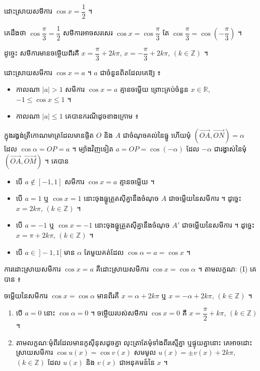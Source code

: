 \begin{example}[ឧទាហរណ៍ ១]
ដោះស្រាយសមីការ $\cos x = \dfrac{1}{2}$ ។

គេដឹងថា $\cos\dfrac{\pi}{3} = \dfrac{1}{2}$ សមីការអាចសរសេរ $\cos x = \cos\dfrac{\pi}{3}$ តែ $\cos\dfrac{\pi}{3} = \cos\left(-\dfrac{\pi}{3}\right)$ ។

ដូច្នេះ សមីការមានចម្លើយពីរគឺ $x = \dfrac{\pi}{3} + 2k\pi$, $x = -\dfrac{\pi}{3} + 2k\pi$, $(k \in \mathbb{Z})$ ។
\end{example}

\begin{example}[ឧទាហរណ៍ ២]
ដោះស្រាយសមីការ $\cos x = a$ ។ $a$ ជាចំនួនពិតដែលគេឱ្យ ៖
\begin{itemize}
  \item កាលណា $|a| > 1$ សមីការ $\cos x = a$ គ្មានចម្លើយ ព្រោះគ្រប់ចំនួន $x \in \mathbb{R}$, $-1 \le \cos x \le 1$ ។
  \item កាលណា $|a| \le 1$ គេបានករណីដូចខាងក្រោម ៖
\end{itemize}
ក្នុងរង្វង់ត្រីកោណមាត្រដែលមានផ្ចិត $O$ និង $A$ ជាចំណុចគល់នៃធ្នូ ហើយមុំ $(\overrightarrow{OA}, \overrightarrow{ON}) = \alpha$ ដែល $\cos\alpha = OP = a$ ។ ម្យ៉ាងវិញទៀត $a = OP = \cos(-\alpha)$ ដែល $-\alpha$ ជារង្វាស់នៃមុំ $(\overrightarrow{OA}, \overrightarrow{OM})$ ។ គេបាន
\begin{itemize}
  \item បើ $a \notin [-1, 1]$ សមីការ $\cos x = a$ គ្មានចម្លើយ ។
  \item បើ $a = 1$ ឬ $\cos x = 1$ នោះចុងធ្នូត្រួតស៊ីគ្នានឹងចំណុច $A$ ជាចម្លើយនៃសមីការ ។ ដូច្នេះ $x = 2k\pi$, $(k \in \mathbb{Z})$ ។
  \item បើ $a = -1$ ឬ $\cos x = -1$ នោះចុងធ្នូត្រួតស៊ីគ្នានឹងចំណុច $A'$ ជាចម្លើយនៃសមីការ ។ ដូច្នេះ $x = \pi + 2k\pi$, $(k \in \mathbb{Z})$ ។
  \item បើ $a \in\ ]-1, 1[$ មាន $\alpha$ តែមួយគត់ដែល $\cos\alpha = a = \cos x$ ។
\end{itemize}
ការដោះស្រាយសមីការ $\cos x = a$ គឺដោះស្រាយសមីការ $\cos x = \cos\alpha$ ។ តាមលក្ខណៈ (I) គេបាន ៖
\end{example}

\begin{formulaBox}[សមីការ $\cos x = \cos\alpha$]
ចម្លើយនៃសមីការ $\cos x = \cos\alpha$ មានពីរគឺ $x = \alpha + 2k\pi$ ឬ $x = -\alpha + 2k\pi$, $(k \in \mathbb{Z})$ ។
\end{formulaBox}

\begin{note}[សម្គាល់]
\begin{enumerate}[1]
  \item បើ $a = 0$ នោះ $\cos\alpha = 0$ ។ ចម្លើយរបស់សមីការ $\cos x = 0$ គឺ $x = \dfrac{\pi}{2} + k\pi$, $(k \in \mathbb{Z})$ ។
  \item តាមលក្ខណៈមុំពីរដែលមានកូស៊ីនុសដូចគ្នា លុះត្រាតែមុំទាំងពីរស្មើគ្នា ឬផ្ទុយគ្នានោះ គេអាចដោះស្រាយសមីការ $\cos u(x) = \cos v(x)$ សមមូល $u(x) = \pm v(x) + 2k\pi$, $(k \in \mathbb{Z})$ ដែល $u(x)$ និង $v(x)$ ជាអនុគមន៍នៃ $x$ ។
\end{enumerate}
\end{note}

